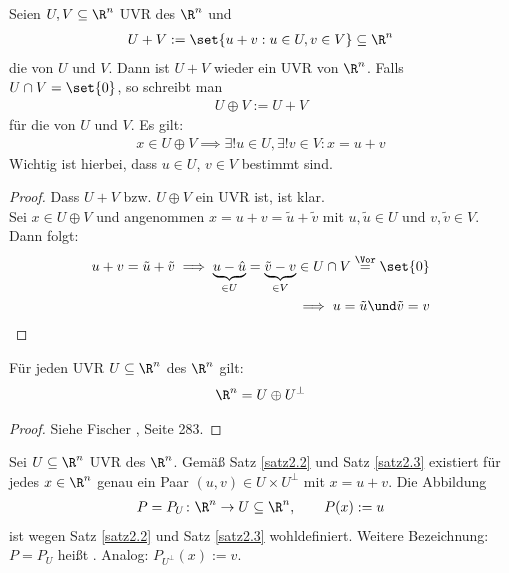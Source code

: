 \begin{satz}\label{satz2.2}
	Seien $U,V\subseteq\R^n$ UVR des $\R^n$ und 
	\begin{align*}
		U+V:=\set{u+v:u\in U,v\in V}\subseteq\R^n
	\end{align*}
	die  von $U$ und $V$.
	Dann ist $U+V$ wieder ein UVR von $\R^n$.
	Falls $U\cap V=\set{0}$, so schreibt man
	\begin{align*}
		U\oplus V:=U+V
	\end{align*}
	für die  von $U$ und $V$.
	Es gilt:
	\begin{align*}
		x\in U\oplus V\implies\exists! u\in U,\exists! v\in V: x=u+v
	\end{align*}
	Wichtig ist hierbei, dass $u\in U$, $v\in V$  bestimmt sind.
\end{satz}

\begin{proof}
	Dass $U+V$ bzw. $U\oplus V$ ein  UVR ist, ist klar.\\
	Sei $x\in U\oplus V$ und angenommen $x=u+v=\tilde{u}+\tilde{v}$ mit $u,\tilde{u}\in U$ und $v,\tilde{v}\in V$.
	Dann folgt:
	\begin{align*}
		u+v=\tilde{u}+\tilde{v}
		\implies
		\underbrace{u-\hat{u}}_{\in U}=\underbrace{\tilde{v}-v}_{\in V}\in U\cap V
		\overset{\Vor}{=}\set{0}\\
		\implies u=\tilde{u}\und\tilde{v}=v
	\end{align*}
\end{proof}

\begin{satz}\label{satz2.3}
	Für jeden UVR $U\subseteq\R^n$ des $\R^n$ gilt:
	\begin{align*}
		\R^n=U\oplus U^\perp
	\end{align*}
\end{satz}

\begin{proof}
	Siehe Fischer \cite{fischerLinAlg}, Seite 283.
\end{proof}

\begin{definition}\label{def2.4}
	Sei $U\subseteq\R^n$ UVR des $\R^n$.	
	Gemäß Satz \ref{satz2.2} und Satz \ref{satz2.3} existiert für jedes $x\in\R^n$ genau ein Paar 
	$(u,v)\in U\times U^\perp$ mit $x=u+v$.
	Die Abbildung
	\begin{align*}
		P=P_U\colon \R^n\to U\subseteq\R^n,\qquad P(x):= u
	\end{align*}
	ist wegen Satz \ref{satz2.2} und Satz \ref{satz2.3} wohldefiniert.
	Weitere Bezeichnung:
	$P=P_U$ heißt .
	Analog: $P_{U^\perp}(x):=v$.
\end{definition}

